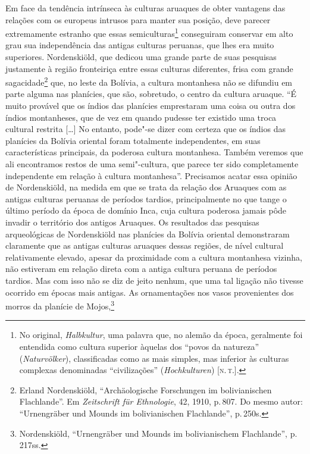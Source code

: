 Em face da tendência intrínseca às culturas aruaques de obter vantagens
das relações com os europeus intrusos para manter sua posição, deve
parecer extremamente estranho que essas semiculturas\footnote{No original,
  \textit{Halbkultur}, uma palavra que, no alemão da época, geralmente
  foi entendida como cultura superior àquelas dos ``povos da natureza''
  (\textit{Naturvölker}), classificadas como as mais simples, mas inferior
  às culturas complexas denominadas ``civilizações'' (\textit{Hochkulturen})
  {[}\textsc{n.\,t.}{]}.} conseguiram
conservar em alto grau sua independência das antigas culturas peruanas,
que lhes era muito superiores. Nordenskiöld, que dedicou uma grande
parte de suas pesquisas justamente à região fronteiriça entre essas
culturas diferentes, frisa com grande sagacidade\footnote{Erland Nordenskiöld, ``Archäologische Forschungen im bolivianischen
  Flachlande''. Em \textit{Zeitschrift für Ethnologie}, 42, 1910, p.\,807.
  Do mesmo autor: ``Urnengräber und Mounds im bolivianischen
  Flachlande'', p.\,250s.} que, no leste da Bolívia, a cultura
montanhesa não se difundiu em parte alguma nas planícies, que são,
sobretudo, o centro da cultura aruaque. ``É muito provável que os índios
das planícies emprestaram uma coisa ou outra dos índios montanheses,
que de vez em quando pudesse ter existido uma troca cultural restrita
{[}\ldots{}{]} No entanto, pode"-se dizer com certeza que os índios das
planícies da Bolívia oriental foram totalmente independentes, em suas
características principais, da poderosa cultura montanhesa. Também
veremos que ali encontramos restos de uma semi"-cultura, que parece ter
sido completamente independente em relação à cultura montanhesa''.
Precisamos acatar essa opinião de Nordenskiöld, na medida em que se
trata da relação dos Aruaques com as antigas culturas peruanas de
períodos tardios, principalmente no que tange o último período da época
de domínio Inca, cuja cultura poderosa jamais pôde invadir o território
dos antigos Aruaques. Os resultados das pesquisas arqueológicas de
Nordenskiöld nas planícies da Bolívia oriental demonstraram claramente
que as antigas culturas aruaques dessas regiões, de nível cultural
relativamente elevado, apesar da proximidade com a cultura montanhesa
vizinha, não estiveram em relação direta com a antiga cultura peruana de
períodos tardios. Mas com isso não se diz de jeito nenhum, que uma tal
ligação não tivesse ocorrido em épocas mais antigas. As ornamentações
nos vasos provenientes dos morros da planície de Mojos,\footnote{Nordenskiöld,
  ``Urnengräber und Mounds im bolivianischem Flachlande'', p.\,217ss.} 
